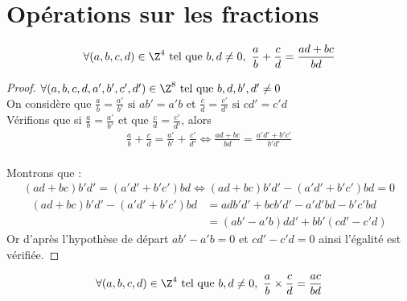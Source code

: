 \section{Opérations sur les fractions}

\begin{graybox}
	\begin{proposition}
		\begin{align*}
			\forall (a, b, c, d) \in \Z^4 \text{ tel que } b, d \neq 0,\ \frac{a}{b} + \frac{c}{d} = \frac{ad + bc}{bd}	
		\end{align*}
	\end{proposition}
\end{graybox}

\begin{proof}
	$\forall (a, b, c, d, a', b', c', d') \in \Z^8 \text{ tel que } b, d, b', d' \neq 0$
	\\
	On considère que 
	$\frac{a}{b} = \frac{a'}{b'} \text{ si } ab' = a'b$
	et 
	$\frac{c}{d} = \frac{c'}{d'} \text{ si } cd' = c'd$
	\\
	Vérifions que si $\frac{a}{b} = \frac{a'}{b'}$ et que $\frac{c}{d} = \frac{c'}{d'}$, alors 
	\begin{align*}
		\frac{a}{b} + \frac{c}{d} = \frac{a'}{b'} + \frac{c'}{d'} \iff \frac{ad + bc}{bd} = \frac{a'd' + b'c'}{b'd'}
	\end{align*}
	\\
	Montrons que :
	\begin{align*}
		(ad + bc)b'd' = (a'd' + b'c')bd \iff (ad + bc)b'd' - (a'd' + b'c')bd = 0
	\end{align*} 
	\begin{align*}
		(ad + bc)b'd' - (a'd' + b'c')bd &= adb'd' + bcb'd' - a'd'bd - b'c'bd \\
		&= (ab' - a'b)dd' + bb'(cd' - c'd)
	\end{align*}
	Or d'après l'hypothèse de départ $ab' - a'b = 0$ et $cd' - c'd = 0$ ainsi l'égalité est vérifiée.
\end{proof}

\begin{graybox}
	\begin{proposition}
		\begin{align*}
			\forall (a, b, c, d) \in \Z^4 \text{ tel que } b, d \neq 0,\ \frac{a}{b} \times \frac{c}{d} = \frac{ac}{bd}	
		\end{align*}
	\end{proposition}
\end{graybox}

